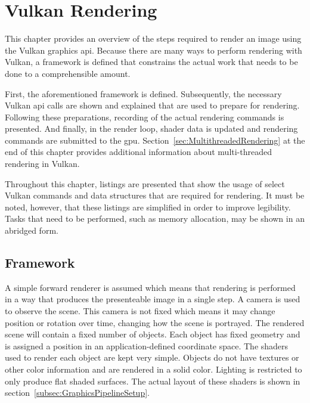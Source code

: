 
\chapter{Vulkan Rendering}
\label{cha:RenderPipeline}

  This chapter provides an overview of the steps required to render an image using the Vulkan graphics \gls{api}.
  Because there are many ways to perform rendering with Vulkan, a framework is defined that constrains the actual work that needs to be done to a comprehensible amount.

  First, the aforementioned framework is defined.
  Subsequently, the necessary Vulkan \gls{api} calls are shown and explained that are used to prepare for rendering.
  Following these preparations, recording of the actual rendering commands is presented.
  And finally, in the render loop, shader data is updated and rendering commands are submitted to the \gls{gpu}.
  Section~\ref{sec:MultithreadedRendering} at the end of this chapter provides additional information about multi-threaded rendering in Vulkan.

  Throughout this chapter, listings are presented that show the usage of select Vulkan commands and data structures that are required for rendering.
  It must be noted, however, that these listings are simplified in order to improve legibility.
  Tasks that need to be performed, such as memory allocation, may be shown in an abridged form.

  \section{Framework}
  \label{sec:Framework}
    A simple forward renderer is assumed which means that rendering is performed in a way that produces the presenteable image in a single step.
    A camera is used to observe the scene.
    This camera is not fixed which means it may change position or rotation over time, changing how the scene is portrayed.
    The rendered scene will contain a fixed number of objects.
    Each object has fixed geometry and is assigned a position in an application-defined coordinate space.
    The shaders used to render each object are kept very simple.
    Objects do not have textures or other color information and are rendered in a solid color.
    Lighting is restricted to only produce flat shaded surfaces.
    The actual layout of these shaders is shown in section~\ref{subsec:GraphicsPipelineSetup}.

